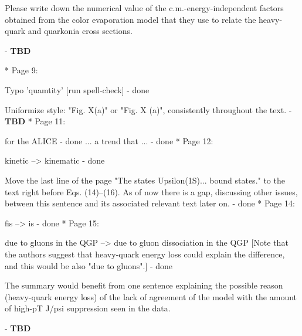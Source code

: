 \documentclass[a4paper,11pt]{article}
\begin{document}
Please write down the numerical value of the c.m.-energy-independent factors obtained 
from the color evaporation model that they use to relate the heavy-quark and quarkonia 
cross sections. 

- {\color{red} \textbf{TBD}}\newline

* Page 9: 

Typo 'quamtity' [run spell-check] 
- {\color{blue} done}\newline

Uniformize style: "Fig. X(a)" or "Fig. X (a)", consistently throughout the text. 
- {\color{red} \textbf{TBD}}\newline
* Page 11: 

for the ALICE 
- {\color{blue} done}\newline
... a trend that ... 
- {\color{blue} done}\newline
* Page 12: 

kinetic --> kinematic 
- {\color{blue} done}\newline

Move the last line of the page "The states Upsilon(1S)... bound states." to 
the text right before Eqs. (14)--(16). As of now there is a gap, discussing 
other issues, between this sentence and its associated relevant text later on. 
- {\color{blue} done}\newline
* Page 14: 

fis --> is 
- {\color{blue} done}\newline
* Page 15: 

due to gluons in the QGP --> due to gluon dissociation in the QGP 
[Note that the authors suggest that heavy-quark energy loss could explain 
the difference, and this would be also "due to gluons".]
- {\color{blue} done}\newline

The summary would benefit from one sentence explaining the possible reason 
(heavy-quark energy loss) of the lack of agreement of the model with 
the amount of high-pT J/psi suppression seen in the data. 

- {\color{red} \textbf{TBD}}\newline










\noindent
\begin{thebibliography}{100}
\medskip



  
\end{thebibliography}
\end{document}

